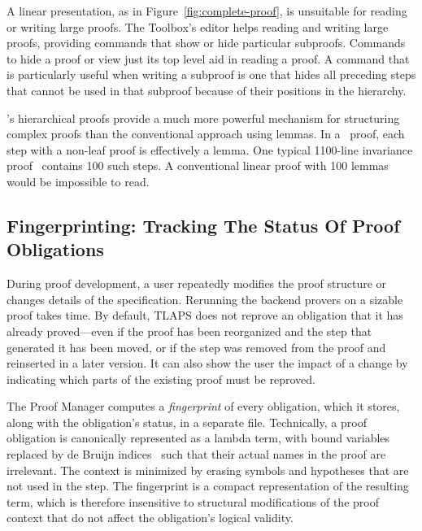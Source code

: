 \documentclass[a4paper,draft]{llncs}
\begin{document}
A linear presentation, as in Figure~\ref{fig:complete-proof}, is
unsuitable for reading or writing large proofs.  The Toolbox's editor helps
reading and writing large \tlaplus proofs, providing commands that
show or hide particular subproofs.  Commands to hide a proof
or view just its top level aid in reading a proof.  A
command that is particularly useful when writing a subproof is one
that hides all preceding steps that cannot be used in that subproof
because of their positions in the hierarchy.

\tlaplus's hierarchical proofs provide a much more powerful mechanism
for structuring complex proofs than the conventional approach using
lemmas.  In a \tlaplus\ proof, each step with a non-leaf proof is
effectively a lemma.  One typical 1100-line invariance
proof~\cite{lamport:byzantine-paxos}
contains 100 such steps.  A conventional linear proof with 100 lemmas
would be impossible to read.


\subsection{Fingerprinting: Tracking The Status Of Proof Obligations}
\label{sec:fingerprinting}

During proof development, a user repeatedly modifies the proof structure or changes
details of the specification. Rerunning the backend provers on a sizable proof
takes time. 
By default, TLAPS does not reprove an obligation that it has already
proved---even if the proof has been reorganized and the step that generated it
has been moved, or if the step was removed from the proof and reinserted in a
later version.  
It can also show the user the impact of a change by
indicating which parts of the existing proof must be reproved.

The Proof Manager computes a \emph{fingerprint} of every obligation, 
which it
stores, along with the obligation's status, in a separate file. Technically, a proof
obligation is canonically represented as a lambda term, 
with bound variables
replaced by de Bruijn indices~\cite{deBruijn72} such that their actual names in the
\tlaplus proof are irrelevant. The context is minimized by erasing symbols and
hypotheses that are not used in the step. The fingerprint is a compact representation
of the resulting term, which is therefore insensitive
to structural modifications of the proof context that do not affect the obligation's logical
validity.
\end{document}
